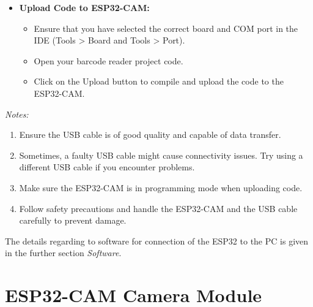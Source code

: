 \begin{itemize}
\begin{itemize}
    \end{itemize}
    \bigskip
    \item \textbf {Upload Code to ESP32-CAM:}
    \begin{itemize}
        \item Ensure that you have selected the correct board and COM port in the IDE (Tools > Board and Tools > Port).
        \item Open your barcode reader project code.
        \item Click on the Upload button to compile and upload the code to the ESP32-CAM.
    \end{itemize}	
\end{itemize}

\textit{Notes:}
\begin{enumerate}
    \item Ensure the USB cable is of good quality and capable of data transfer.
    \item Sometimes, a faulty USB cable might cause connectivity issues. Try using a different USB cable if you encounter problems.
    \item Make sure the ESP32-CAM is in programming mode when uploading code.
    \item Follow safety precautions and handle the ESP32-CAM and the USB cable carefully to prevent damage.
\end{enumerate}

The details regarding to software for connection of the ESP32 to the PC is given in the further section \textit{Software}.

\section{ESP32-CAM Camera Module}

